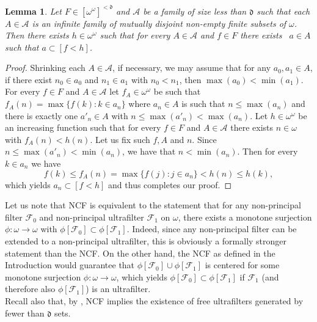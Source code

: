 \documentclass[12pt,a4paper]{amsart}
\newtheorem{lemma}[theorem]{Lemma}
\theoremstyle{definition}
\newcommand{\w}{\omega}
\newcommand{\A}{\mathcal{A}}
\newcommand{\F}{\mathcal{F}}
\newcommand{\hot}{\mathfrak}
\begin{document}
\begin{lemma} \label{less_d}
Let $F\in [\w^\w]^{<\hot d}$ and 
$\mathcal A$ be a family of size less than $\hot d$
such that each $A\in\mathcal A$ is an infinite family of mutually disjoint 
non-empty finite subsets of $\w$. Then there exists 
$h\in\w^\w$ such that 
for every $A\in \mathcal A$ and $f\in F$ there exists \
$a\in A$ such that $a\subset [f<h]$.
\end{lemma}
\begin{proof}
Shrinking each $A\in\A$, if necessary, we may assume that
for any $a_0,a_1\in A$, if there exist $n_0\in a_0$ and $n_1\in a_1$
with $n_0<n_1$, then $\max(a_0)<\min(a_1)$. 
For every $f\in F$ and $A\in \A$ let $f_A\in\w^\w$ be such that 
 $f_A (n)= \max\{f(k):k\in a_n\}$
where $a_n\in A$ is such that $n\leq \max(a_n)$ and there is exactly one
$a'_n \in A$ with $n\leq\max(a'_n)<\max(a_n)$. Let $h\in\w^\w$ be an increasing function such that for every $f\in F$ and $A\in\A$ there exists 
$n\in \w$ with $f_A(n)<h(n)$. Let us fix such $f,A$ and $n$.
Since $n\leq \max(a'_n)<\min(a_n)$,
we have that $n<\min(a_n)$.
Then for every $k\in a_n$ we have 
$$ f(k)\leq f_A(n)={\max\{f(j):j\in a_n\}}<h(n)\leq h(k), $$
which yields $a_n\subset [f<h]$ and thus completes our proof.
\end{proof}

{
Let us note that NCF is equivalent to the statement that
for any non-principal filter $\F_0$ and non-principal ultrafilter $\F_1$ on $\w$, there exists a monotone surjection $\phi:\w\to\w$ with $\phi[\F_0]\subset\phi[\F_1].$ Indeed, since any non-principal filter can be extended to a non-principal ultrafilter, this is obviously a 
formally stronger statement than the NCF. On the other hand,
the NCF as defined in the Introduction would guarantee that 
$\phi[\F_0]\cup\phi[\F_1]$ is centered for some monotone surjection
$\phi:\w\to\w$, which yields $\phi[\F_0]\subset\phi[\F_1]$ if
$\F_1$ (and therefore also $\phi[\F_1]$) is an ultrafilter.}\\

{Recall also that, by \cite[Corollary 5]{Bla86}, NCF implies the existence of free ultrafilters generated by fewer than $\hot d$ sets.}
\end{document}
